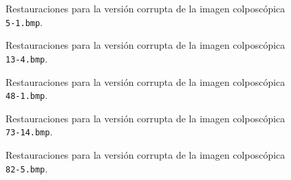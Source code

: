 \begin{figure}[H]
	\centering
	\caption{Restauraciones para la versi\'on corrupta de la imagen colposc\'opica \texttt{5-1.bmp}.}
	\label{fig:5-1.bmp}
\end{figure}

\begin{figure}[H]
	\centering
	\caption{Restauraciones para la versi\'on corrupta de la imagen colposc\'opica \texttt{13-4.bmp}.}
	\label{fig:13-4.bmp}
\end{figure}

\begin{figure}[H]
	\centering
	\caption{Restauraciones para la versi\'on corrupta de la imagen colposc\'opica \texttt{48-1.bmp}.}
	\label{fig:48-1.bmp}
\end{figure}

\begin{figure}[H]
	\centering
	\caption{Restauraciones para la versi\'on corrupta de la imagen colposc\'opica \texttt{73-14.bmp}.}
	\label{fig:73-14.bmp}
\end{figure}

\begin{figure}[H]
	\centering
	\caption{Restauraciones para la versi\'on corrupta de la imagen colposc\'opica \texttt{82-5.bmp}.}
	\label{fig:82-5.bmp}
\end{figure}